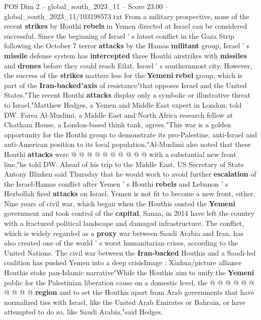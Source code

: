 \begin{textsample}{POS Dim 2 – global\_south\_2023\_11 – Score 23.00 – global\_south\_2023\_11/103198573.txt}  \label{ex:f2_pos_212}
From a military prospective, none of the recent \textbf{strikes} by Houthi \textbf{rebels} in Yemen directed at Israel can be considered successful.
Since the beginning of Israel ' s latest conflict in the Gaza Strip following the October 7 terror \textbf{attacks} by the Hamas \textbf{militant} group, Israel ' s \textbf{missile} defense system has \textbf{intercepted} three Houthi airstrikes with \textbf{missiles} and \textbf{drones} before they could reach Eilat, Israel ' s southernmost city.
However, the success of the \textbf{strikes} matters less for the \textbf{Yemeni} \textbf{rebel} group, which is part of the \textbf{Iran-backed}"\textbf{axis} of resistance"that opposes Israel and the United States."The recent Houthi \textbf{attacks} display only a symbolic or illustrative threat to Israel,"Matthew Hedges, a Yemen and Middle East expert in London, told DW.
Farea Al-Muslimi, a Middle East and North Africa research fellow at Chatham House, a London-based think tank, agrees."This war is a golden opportunity for the Houthi group to demonstrate its pro-Palestine, anti-Israel and anti-American position to its local population."Al-Muslimi also noted that these Houthi \textbf{attacks} were @ @ @ @ @ @ @ @ @ @ with a substantial new front line,"he told DW.
Ahead of his trip to the Middle East, US Secretary of State Antony Blinken said Thursday that he would work to avoid further \textbf{escalation} of the Israel-Hamas conflict after Yemen ' s Houthi \textbf{rebels} and Lebanon ' s Hezbollah fired \textbf{attacks} on Israel.
Yemen is not fit to become a new front, either.
Nine years of civil war, which began when the Houthis ousted the \textbf{Yemeni} government and took control of the \textbf{capital}, Sanaa, in 2014 have left the country with a fractured political landscape and damaged infrastructure.
The conflict, which is widely regarded as a \textbf{proxy} war between Saudi Arabia and Iran, has also created one of the world ' s worst humanitarian crises, according to the United Nations.
The civil war between the \textbf{Iran-backed} Houthis and a Saudi-led coalition has pushed Yemen into a deep crisisImage : Xinhua/picture alliance Houthis stoke pan-Islamic narrative"While the Houthis aim to unify the \textbf{Yemeni} public for the Palestinian liberation cause on a domestic level, the @ @ @ @ @ @ @ @ @ @ \textbf{region} and to set the Houthis apart from Arab governments that have normalized ties with Israel, like the United Arab Emirates or Bahrain, or have attempted to do so, like Saudi Arabia,"said Hedges.

\end{textsample}
